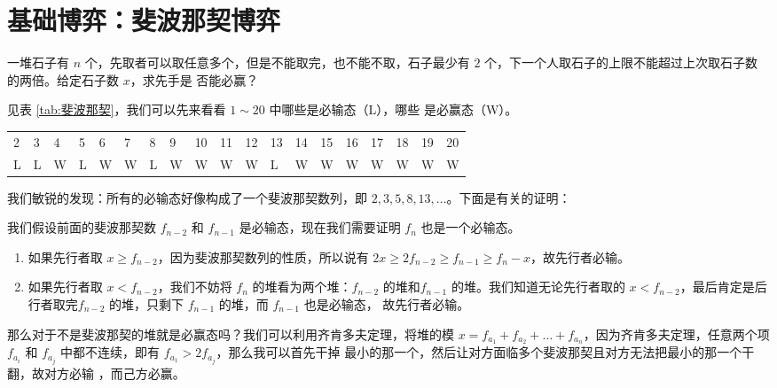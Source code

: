 \section{基础博弈：斐波那契博弈}
一堆石子有 $n$ 个，先取者可以取任意多个，但是不能取完，也不能不取，石子最少有
$2$ 个，下一个人取石子的上限不能超过上次取石子数的两倍。给定石子数 $x$，求先手是
否能必赢？

见表 \ref{tab:斐波那契}，我们可以先来看看 $1 \sim 20$ 中哪些是必输态（L），哪些
是必赢态（W）。

\begin{table*}
\centering
\begin{tabular}{lllllllllllllllllll}
    \toprule
    2 & 3 & 4 & 5 & 6 & 7 & 8 & 9 & 10 & 11 & 12 & 13 & 14 & 15 & 16 & 17 & 18 &
    19 & 20 \\
    L & L & W & L & W & W & L & W &  W &  W &  W &  L &  W &  W &  W &  W &  W &
    W &  W  \\
    \bottomrule
\end{tabular}
\caption{斐波那契博弈的前 20 种情况}
\label{tab:斐波那契}
\end{table*}

我们敏锐的发现：所有的必输态好像构成了一个斐波那契数列，即 $2, 3, 5, 8, 13,
\ldots$。下面是有关的证明：

我们假设前面的斐波那契数 $f_{n-2}$ 和 $f_{n-1}$ 是必输态，现在我们需要证明 $f_n$
也是一个必输态。

\begin{enumerate}
    \item 如果先行者取 $x \geq f_{n-2}$，因为斐波那契数列的性质，所以说有 $2x
        \geq 2f_{n-2} \geq f_{n-1} \geq f_n - x$，故先行者必输。

    \item 如果先行者取 $x < f_{n-2}$，我们不妨将 $f_n$ 的堆看为两个堆：$f_{n-2}$
        的堆和$f_{n-1}$ 的堆。我们知道无论先行者取的 $x < f_{n-2}$，最后肯定是后
        行者取完$f_{n-2}$ 的堆，只剩下 $f_{n-1}$ 的堆，而 $f_{n-1}$ 也是必输态，
        故先行者必输。
\end{enumerate}

那么对于不是斐波那契的堆就是必赢态吗？我们可以利用齐肯多夫定理，将堆的模 $x
= f_{a_1} + f_{a_2} + \ldots + f_{a_n}$，因为齐肯多夫定理，任意两个项
$f_{a_i}$ 和 $f_{a_j}$ 中都不连续，即有 $f_{a_1} > 2f_{a_j}$，那么我可以首先干掉
最小的那一个，然后让对方面临多个斐波那契且对方无法把最小的那一个干翻，故对方必输
，而己方必赢。

